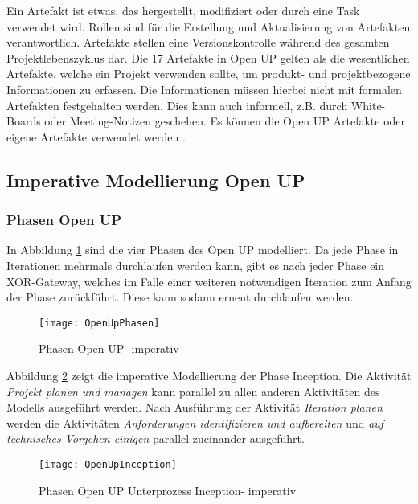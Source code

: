 Ein Artefakt ist etwas, das hergestellt, modifiziert oder durch eine Task verwendet wird. Rollen sind 
für die Erstellung und Aktualisierung von Artefakten verantwortlich. Artefakte stellen eine Versionskontrolle während des gesamten Projektlebenszyklus dar. Die 17 Artefakte in Open UP gelten als die wesentlichen Artefakte, welche ein Projekt verwenden sollte, um produkt- und projektbezogene Informationen zu erfassen. Die Informationen müssen hierbei nicht mit formalen Artefakten festgehalten werden. Dies kann auch informell, z.B. durch White-Boards oder Meeting-Notizen geschehen. Es können die Open UP Artefakte oder eigene Artefakte verwendet werden \cite{eclipseopenup}.

\subsection{Imperative Modellierung Open UP}

 \subsubsection{Phasen Open UP}

In Abbildung \ref{fig:OpenUpPhasen} sind die vier Phasen des Open UP modelliert. Da jede Phase in Iterationen mehrmals durchlaufen werden kann, gibt es nach jeder Phase ein XOR-Gateway, welches im Falle einer weiteren notwendigen Iteration zum Anfang der Phase zurückführt. Diese kann sodann erneut durchlaufen werden.

\begin{figure}[htp]
\begin{center}
  \texttt{[image: OpenUpPhasen]} %
  \caption{Phasen Open UP- imperativ}
  \label{fig:OpenUpPhasen}
\end{center}
\end{figure}

Abbildung \ref{fig:OpenUpInception} zeigt die imperative Modellierung der Phase Inception. Die Aktivität \textit{Projekt planen und managen} kann parallel zu allen anderen Aktivitäten des Modells ausgeführt werden.\newline
Nach Ausführung der Aktivität \textit{Iteration planen} werden die Aktivitäten \textit{Anforderungen identifizieren und aufbereiten} und \textit{auf technisches Vorgehen einigen} parallel zueinander ausgeführt.

\begin{figure}[htp]
\begin{center}
  \texttt{[image: OpenUpInception]} %
  \caption{Phasen Open UP Unterprozess Inception- imperativ}
  \label{fig:OpenUpInception}
\end{center}
\end{figure}

